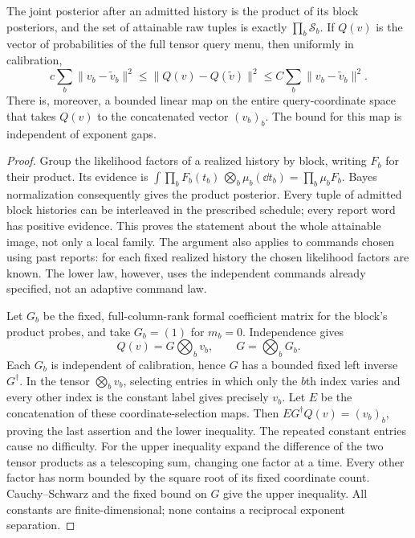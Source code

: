 \begin{lemma}\label{lem:product-metric}
The joint posterior after an admitted history is the product of its block
posteriors, and the set of attainable raw tuples is exactly
$\prod_b\mathcal S_b$. If $Q(v)$ is the vector of probabilities of the
full tensor query menu, then uniformly in calibration,
\begin{equation}\label{eq:tensor-metric}
 c\sum_b\|v_b-\widetilde v_b\|^2
 \le \|Q(v)-Q(\widetilde v)\|^2
 \le C\sum_b\|v_b-\widetilde v_b\|^2.
\end{equation}
There is, moreover, a bounded linear map on the entire query-coordinate
space that takes $Q(v)$ to the concatenated vector $(v_b)_b$.
The bound for this map is independent of exponent gaps.
\end{lemma}
\begin{proof}
Group the likelihood factors of a realized history by block, writing
$F_b$ for their product. Its evidence is
$\int\prod_bF_b(t_b)\,\bigotimes_b\mu_b(\dd t_b)
=\prod_b\mu_bF_b$. Bayes normalization consequently gives the product
posterior. Every tuple of admitted block histories can be interleaved in
the prescribed schedule; every report word has positive evidence.
This proves the statement about the whole attainable image, not only a
local family. The argument also applies to commands chosen using past
reports: for each fixed realized history the chosen likelihood factors
are known. The lower law, however, uses the independent commands already
specified, not an adaptive command law.

Let $G_b$ be the fixed, full-column-rank formal coefficient matrix for the
block's product probes, and take $G_b=(1)$ for $m_b=0$. Independence gives
\[
 Q(v)=G\bigotimes_bv_b,\qquad G=\bigotimes_bG_b.
\]
Each $G_b$ is independent of calibration, hence $G$ has a bounded fixed
left inverse $G^\dagger$. In the tensor $\bigotimes_bv_b$, selecting
entries in which only the $b$th index varies and every other index is the
constant label gives precisely $v_b$. Let $E$ be the concatenation of
these coordinate-selection maps. Then
$E G^\dagger Q(v)=(v_b)_b$, proving the last assertion and the lower
inequality. The repeated constant entries cause no difficulty.
For the upper inequality expand the difference of the two tensor products
as a telescoping sum, changing one factor at a time. Every other factor
has norm bounded by the square root of its fixed coordinate count.
Cauchy--Schwarz and the fixed bound on $G$ give the upper inequality.
All constants are finite-dimensional; none contains a reciprocal
exponent separation.
\end{proof}

